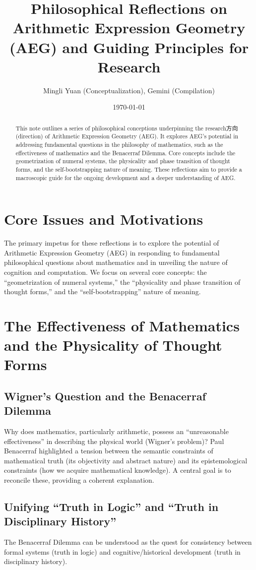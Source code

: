 \documentclass{article}
\title{Philosophical Reflections on Arithmetic Expression Geometry (AEG) and Guiding Principles for Research}
\author{Mingli Yuan (Conceptualization), Gemini (Compilation)}
\date{\today}
\begin{document}
\maketitle
\begin{abstract}
This note outlines a series of philosophical conceptions underpinning the research方向 (direction) of Arithmetic Expression Geometry (AEG). It explores AEG's potential in addressing fundamental questions in the philosophy of mathematics, such as the effectiveness of mathematics and the Benacerraf Dilemma. Core concepts include the geometrization of numeral systems, the physicality and phase transition of thought forms, and the self-bootstrapping nature of meaning. These reflections aim to provide a macroscopic guide for the ongoing development and a deeper understanding of AEG.
\end{abstract}

\section{Core Issues and Motivations}
The primary impetus for these reflections is to explore the potential of Arithmetic Expression Geometry (AEG) in responding to fundamental philosophical questions about mathematics and in unveiling the nature of cognition and computation. We focus on several core concepts: the ``geometrization of numeral systems,'' the ``physicality and phase transition of thought forms,'' and the ``self-bootstrapping'' nature of meaning.

\section{The Effectiveness of Mathematics and the Physicality of Thought Forms}

\subsection{Wigner's Question and the Benacerraf Dilemma}
Why does mathematics, particularly arithmetic, possess an ``unreasonable effectiveness'' in describing the physical world (Wigner's problem)? Paul Benacerraf highlighted a tension between the semantic constraints of mathematical truth (its objectivity and abstract nature) and its epistemological constraints (how we acquire mathematical knowledge). A central goal is to reconcile these, providing a coherent explanation.

\subsection{Unifying ``Truth in Logic'' and ``Truth in Disciplinary History''}
The Benacerraf Dilemma can be understood as the quest for consistency between formal systems (truth in logic) and cognitive/historical development (truth in disciplinary history).
\end{document}
